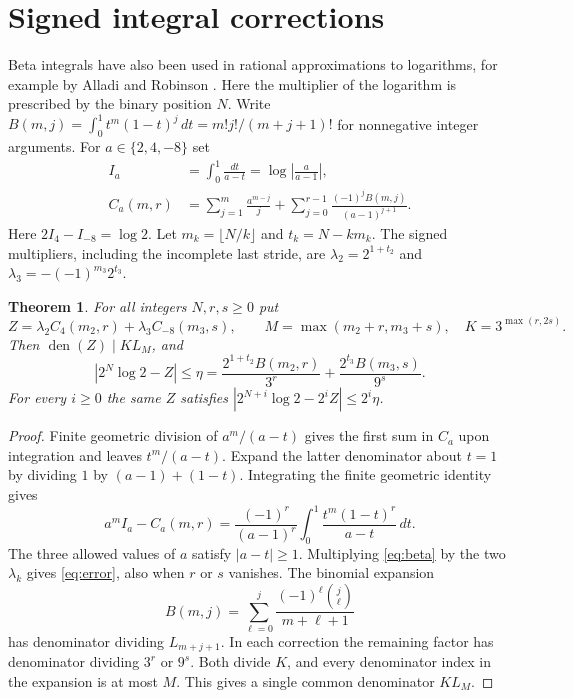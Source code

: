 \documentclass[11pt]{article}
\newtheorem{theorem}{Theorem}[section]
\DeclareMathOperator{\den}{den}
\begin{document}
\section{Signed integral corrections}\label{sec:correct}
Beta integrals have also been used in rational approximations to logarithms, for example by Alladi and Robinson \cite{alladi}. Here the multiplier of the logarithm is prescribed by the binary position $N$.
Write $B(m,j)=\int_0^1t^m(1-t)^j\,dt=m!j!/(m+j+1)!$ for nonnegative integer
arguments. For $a\in\{2,4,-8\}$ set
\begin{align*}
 I_a&=\int_0^1\frac{dt}{a-t}=\log\left|\frac{a}{a-1}\right|,\\
 C_a(m,r)&=\sum_{j=1}^m\frac{a^{m-j}}{j}
       +\sum_{j=0}^{r-1}\frac{(-1)^jB(m,j)}{(a-1)^{j+1}} .
\end{align*}
Here $2I_4-I_{-8}=\log 2$. Let $m_k=\lfloor N/k\rfloor$ and $t_k=N-km_k$.
The signed multipliers, including the incomplete last stride, are
$\lambda_2=2^{1+t_2}$ and $\lambda_3=-(-1)^{m_3}2^{t_3}$.

\begin{theorem}\label{th:correct}
For all integers $N,r,s\ge0$ put
\[
 Z=\lambda_2 C_4(m_2,r)+\lambda_3 C_{-8}(m_3,s),\qquad
 M=\max(m_2+r,m_3+s),\quad K=3^{\max(r,2s)} .
\]
Then $\den(Z)\mid KL_M$, and
\begin{equation}
 |2^N\log 2-Z|\le
 \eta=\frac{2^{1+t_2}B(m_2,r)}{3^r}+
       \frac{2^{t_3}B(m_3,s)}{9^s}.
 \label{eq:error}
\end{equation}
For every $i\ge0$ the same $Z$ satisfies $|2^{N+i}\log 2-2^iZ|\le2^i\eta$.
\end{theorem}
\begin{proof}
Finite geometric division of $a^m/(a-t)$ gives the first sum in $C_a$ upon
integration and leaves $t^m/(a-t)$. Expand the latter denominator about $t=1$
by dividing $1$ by $(a-1)+(1-t)$. Integrating the finite geometric identity gives
\begin{equation}
 a^m I_a-C_a(m,r)=\frac{(-1)^r}{(a-1)^r}
   \int_0^1\frac{t^m(1-t)^r}{a-t}\,dt .
 \label{eq:beta}
\end{equation}
The three allowed values of $a$ satisfy $|a-t|\ge1$. Multiplying
\eqref{eq:beta} by the two $\lambda_k$ gives \eqref{eq:error}, also when
$r$ or $s$ vanishes. The binomial expansion
\[
 B(m,j)=\sum_{\ell=0}^j\frac{(-1)^\ell\binom j\ell}{m+\ell+1}
\]
has denominator dividing $L_{m+j+1}$. In each correction the remaining factor
has denominator dividing $3^r$ or $9^s$. Both divide $K$, and every denominator index
in the expansion is at most $M$. This gives a single common denominator $KL_M$.
\end{proof}
\end{document}
